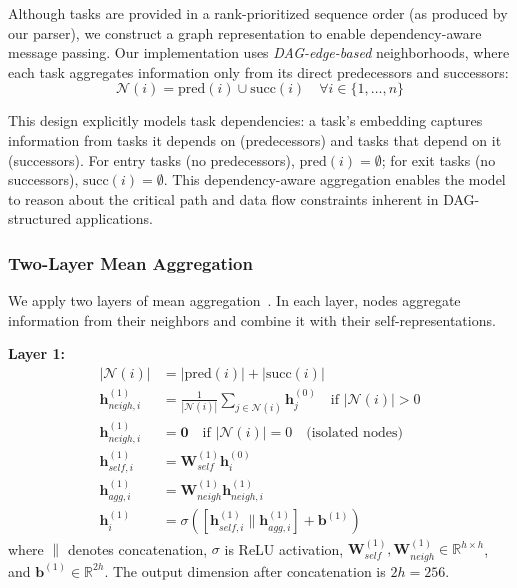 \documentclass[journal,twoside]{IEEEtran}
\newcommand{\R}{\mathbb{R}}
\begin{document}
Although tasks are provided in a rank-prioritized sequence order (as produced by our parser), we construct a graph representation to enable dependency-aware message passing. Our implementation uses \textit{DAG-edge-based} neighborhoods, where each task aggregates information only from its direct predecessors and successors:
\begin{equation}
\mathcal{N}(i) = \text{pred}(i) \cup \text{succ}(i) \quad \forall i \in \{1, \ldots, n\}
\label{eq:dag_neighborhood}
\end{equation}

This design explicitly models task dependencies: a task's embedding captures information from tasks it depends on (predecessors) and tasks that depend on it (successors). For entry tasks (no predecessors), $\text{pred}(i) = \emptyset$; for exit tasks (no successors), $\text{succ}(i) = \emptyset$. This dependency-aware aggregation enables the model to reason about the critical path and data flow constraints inherent in DAG-structured applications.

\subsubsection{Two-Layer Mean Aggregation}

We apply two layers of mean aggregation~\cite{hamilton2017inductive}. In each layer, nodes aggregate information from their neighbors and combine it with their self-representations.

\textbf{Layer 1:}
    \begin{align}
|\mathcal{N}(i)| &= |\text{pred}(i)| + |\text{succ}(i)| \label{eq:neigh_size}\\
\mathbf{h}_{neigh,i}^{(1)} &= \frac{1}{|\mathcal{N}(i)|} \sum_{j \in \mathcal{N}(i)} \mathbf{h}_j^{(0)} \quad \text{if } |\mathcal{N}(i)| > 0 \label{eq:mean_agg_1}\\
\mathbf{h}_{neigh,i}^{(1)} &= \mathbf{0} \quad \text{if } |\mathcal{N}(i)| = 0 \quad \text{(isolated nodes)} \label{eq:mean_agg_1_empty}\\
\mathbf{h}_{self,i}^{(1)} &= \mathbf{W}_{self}^{(1)} \mathbf{h}_i^{(0)} \label{eq:self_transform_1}\\
\mathbf{h}_{agg,i}^{(1)} &= \mathbf{W}_{neigh}^{(1)} \mathbf{h}_{neigh,i}^{(1)} \label{eq:neigh_transform_1}\\
\mathbf{h}_i^{(1)} &= \sigma\left( \left[ \mathbf{h}_{self,i}^{(1)} \| \mathbf{h}_{agg,i}^{(1)} \right] + \mathbf{b}^{(1)} \right) \label{eq:combine_1}
    \end{align}
where $\|$ denotes concatenation, $\sigma$ is ReLU activation, $\mathbf{W}_{self}^{(1)}, \mathbf{W}_{neigh}^{(1)} \in \R^{h \times h}$, and $\mathbf{b}^{(1)} \in \R^{2h}$. The output dimension after concatenation is $2h = 256$.
\end{document}
